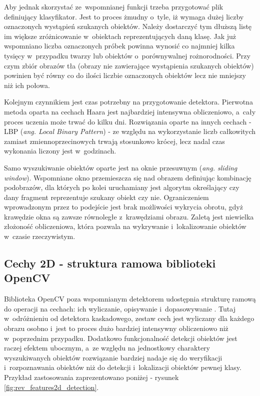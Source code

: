 Aby jednak skorzystać
ze~wspomnianej funkcji trzeba przygotować plik
definiujący klasyfikator. Jest to proces żmudny o~tyle, iż wymaga
dużej liczby oznaczonych wystąpień szukanych obiektów. Należy dostarczyć
tym dłuższą listę im większe zróżnicowanie w~obiektach reprezentujących
daną klasę. Jak już wspomniano liczba oznaczonych próbek powinna wynosić
co najmniej kilka tysięcy w~przypadku twarzy lub obiektów o~porównywalnej
rożnorodności. Przy czym zbiór obrazów tła (obrazy nie zawierające wystąpienia
szukanych obiektów)
powinien być równy co do ilości liczbie oznaczonych obiektów
lecz nie mniejszy niż ich połowa.

Kolejnym czynnikiem jest czas potrzebny na przygotowanie detektora.
Pierwotna metoda oparta na cechach Haara
jest najbardziej intensywna obliczeniowo, a~cały proces uczenia
może trwać do kilku dni. Rozwiązania oparte na innych cechach - LBP
(\textit{ang. Local Binary Pattern}) - ze względu na wykorzystanie
liczb całkowitych zamiast zmiennoprzecinowych trwają stosunkowo krócej, lecz
nadal czas wykonania liczony jest w~godzinach.

Samo wyszukiwanie obiektów oparte jest na oknie przesuwnym
(\textit{ang. sliding window}). Wspomniane okno przemieszcza się nad
obrazem definiując kombinację podobrazów, dla których po kolei uruchamiany
jest algorytm określający czy dany fragment reprezentuje szukany obiekt czy
nie. Ograniczeniem wprowadzonym przez to podejście jest brak możliwości
wykrycia obrotu, gdyż krawędzie okna są zawsze równoległe z~krawędziami
obrazu. Zaletą jest niewielka złożoność obliczeniowa, która pozwala
na wykrywanie i~lokalizowanie obiektów w~czasie rzeczywistym.

\subsection{Cechy 2D - struktura ramowa biblioteki OpenCV}

Biblioteka OpenCV poza wspomnianym detektorem udostępnia
strukturę ramową do operacji na cechach: ich wyliczanie, opisywanie
i~dopasowywanie \cite{OCV:feture2dframework}.
Tutaj w~odróżnieniu od detektora kaskadowego, zestaw cech
jest wyliczany dla każdego obrazu osobno i~jest to proces dużo bardziej
intensywny obliczeniowo niż w~poprzednim przypadku. Dodatkowo
funkcjonalność detekcji obiektów jest raczej efektem ubocznym,
a~ze względu na jednostkowy charaktery wyszukiwanych obiektów rozwiązanie
bardziej nadaje się do weryfikacji i~rozpoznawania obiektów niż do
detekcji i~lokalizacji obiektów pewnej klasy. Przykład zastosowania
zaprezentowano poniżej - rysunek \ref{fig:rev_features2d_detection}.

